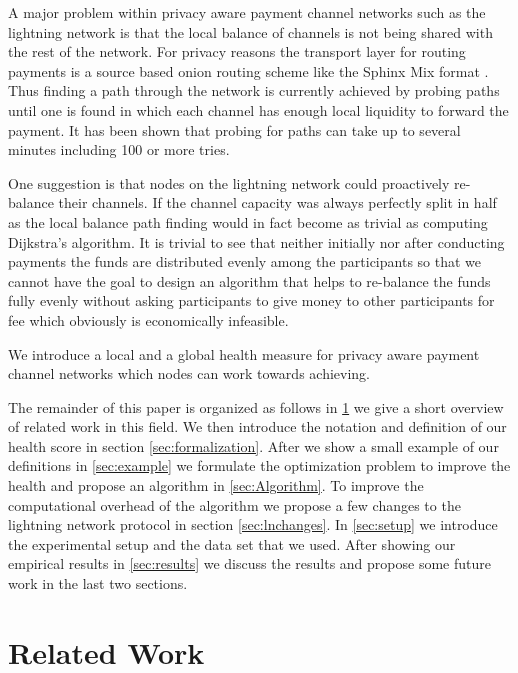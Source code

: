 \documentclass[a4paper]{paper}
\begin{document}
A major problem within privacy aware payment channel networks such as the lightning network is that the local balance of channels is not being shared with the rest of the network.
For privacy reasons the transport layer for routing payments is a source based onion routing scheme like the Sphinx Mix format \cite{danezis2009sphinx}.
Thus finding a path through the network is currently achieved by probing paths until one is found in which each channel has enough local liquidity to forward the payment.
It has been shown that probing for paths can take up to several minutes including 100 or more tries.\cite{decker2019lnconf}

One suggestion is that nodes on the lightning network could proactively re-balance their channels.
If the channel capacity was always perfectly split in half as the local balance path finding would in fact become as trivial as computing Dijkstra's algorithm.
It is trivial to see that neither initially nor after conducting payments the funds are distributed evenly among the participants so that we cannot have the goal to design an algorithm that helps to re-balance the funds fully evenly without asking participants to give money to other participants for fee which obviously is economically infeasible. 

We introduce a local and a global health measure for privacy aware payment channel networks which nodes can work towards achieving.

The remainder of this paper is organized as follows in \cref{sec:relatedWork} we give a short overview of related work in this field.
We then introduce the notation and definition of our health score in section \cref{sec:formalization}.
After we show a small example of our definitions in \cref{sec:example} we formulate the optimization problem to improve the health and propose an algorithm in \ref{sec:Algorithm}.
To improve the computational overhead of the algorithm we propose a few changes to the lightning network protocol in section \ref{sec:lnchanges}.
In \cref{sec:setup} we introduce the experimental setup and the data set that we used.
After showing our empirical results in \cref{sec:results} we discuss the results and propose some future work in the last two sections.



\section{Related Work}
\label{sec:relatedWork}
\end{document}
